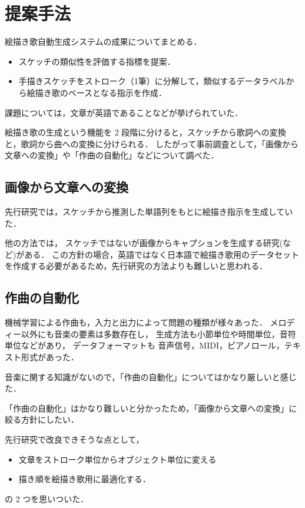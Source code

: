 \documentclass[twocolumn]{jarticle}     %
\begin{document}
\section{提案手法}

絵描き歌自動生成システムの成果についてまとめる．
\begin{itemize}
  \item スケッチの類似性を評価する指標を提案．
  \item 手描きスケッチをストローク（1筆）に分解して，類似するデータラベルから絵描き歌のベースとなる指示を作成．
\end{itemize}
課題については，文章が英語であることなどが挙げられていた．

絵描き歌の生成という機能を 2 段階に分けると，スケッチから歌詞への変換と，歌詞から曲への変換に分けられる．
したがって事前調査として，「画像から文章への変換」や「作曲の自動化」などについて調べた．

\subsection{画像から文章への変換}
先行研究では，スケッチから推測した単語列をもとに絵描き指示を生成していた．

他の方法では，
スケッチではないが画像からキャプションを生成する研究(\cite{vinyals2015show}など)がある．
この方針の場合，英語ではなく日本語で絵描き歌用のデータセットを作成する必要があるため，先行研究の方法よりも難しいと思われる．

\subsection{作曲の自動化}
機械学習による作曲も，入力と出力によって問題の種類が様々あった．
メロディー以外にも音楽の要素は多数存在し，
生成方法も小節単位や時間単位，音符単位などがあり，
データフォーマットも 音声信号，MIDI，ピアノロール，テキスト形式があった．

音楽に関する知識がないので，「作曲の自動化」についてはかなり厳しいと感じた．

「作曲の自動化」はかなり難しいと分かったため，「画像から文章への変換」に絞る方針にしたい．

先行研究で改良できそうな点として，
\begin{itemize}
  \item 文章をストローク単位からオブジェクト単位に変える
  \item 描き順を絵描き歌用に最適化する．
\end{itemize}
の 2 つを思いついた．
\end{document}
